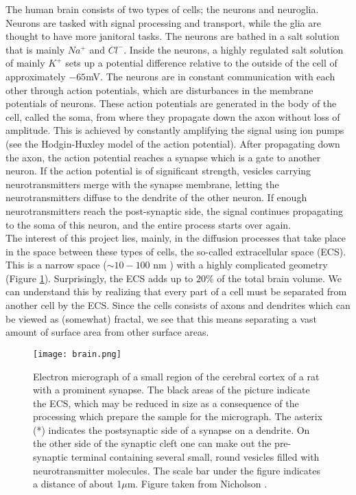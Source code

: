 \documentclass[a4paper,english, 12pt, twoside]{article}
\begin{document}
The human brain consists of two types of cells; the neurons and neuroglia. 
Neurons are tasked with signal processing and transport, while the glia are thought to have more janitoral tasks. 
The neurons are bathed in a salt solution that is mainly $Na^+$ and $Cl^-$. 
Inside the neurons, a highly regulated salt solution of mainly $K^+$ sets up a potential difference relative to the outside of the cell of approximately $-65$mV.
The neurons are in constant communication with each other through action potentials, which are disturbances in the membrane potentials of neurons. 
These action potentials are generated in the body of the cell, called the soma, from where they propagate down the axon without loss of amplitude. 
This is achieved by constantly amplifying the signal using ion pumps (see the Hodgin-Huxley model of the action potential).
After propagating down the axon, the action potential reaches a synapse which is a gate to another neuron. 
If the action potential is of significant strength, vesicles carrying neurotransmitters merge with the synapse membrane, letting the neurotransmitters diffuse to the dendrite of the other neuron. 
If enough neurotransmitters reach the post-synaptic side, the signal continues propagating to the soma of this neuron, and the entire process starts over again. \\
The interest of this project lies, mainly, in the diffusion processes that take place in the space between these types of cells, the so-called extracellular space (ECS). 
This is a narrow space ($\sim 10-100$ nm \cite{nicholson2001diffusion}) with a highly complicated geometry (Figure \ref{ECS}). 
Surprisingly, the ECS adds up to $20\%$ of the total brain volume. 
We can understand this by realizing that every part of a cell must be separated from another cell by the ECS. 
Since the cells consists of axons and dendrites which can be viewed as (somewhat) fractal, we see that this means separating a vast amount of surface area from other surface areas.

\begin{figure}[H]
 \centering
 \texttt{[image: brain.png]}
 \caption{Electron micrograph of a small region of the cerebral cortex of a rat with a prominent synapse. 
 The black areas of the picture indicate the ECS, which may be reduced in size as a consequence of the processing which prepare the sample for the micrograph. 
 The asterix (*) indicates the postsynaptic side of a synapse on a dendrite. 
 On the other side of the synaptic cleft one can make out the pre-synaptic terminal containing several small, round vesicles filled with neurotransmitter molecules. 
 The scale bar under the figure indicates a distance of about 1$\mu$m. 
 Figure taken from Nicholson \cite{nicholson2001diffusion}.}
 \label{ECS}
\end{figure}
\end{document}
